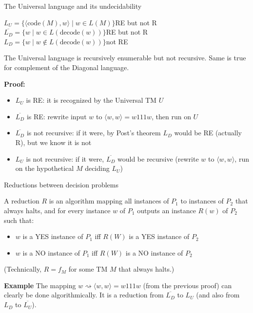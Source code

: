 \documentclass[handout]{beamer}
\begin{document}
\begin{frame}{The Universal language and its undecidability}

    $L_U=\{\langle \mathrm{code}(M),w\rangle\mid w\in L(M)\}$\hfill RE but not R\\
    $\overline{L_D}=\{w\mid w\in L(\mathrm{decode}(w))\}$\hfill RE but not R\\
    $L_D=\{w\mid w\notin L(\mathrm{decode}(w))\}$\hfill not RE

    \medskip

    \begin{theorem}
        The Universal language is recursively enumerable but not recursive. Same is true for complement of the Diagonal language.
    \end{theorem}    

    \vspace{-6pt}
    \textbf{Proof:}
    \vspace{-6pt}
        \begin{itemize}
            \item \alert{$L_U$ is RE:} it is recognized by the Universal TM $U$
            \item \alert{$\overline{L_D}$ is RE:} rewrite input $w$ to $\langle w,w\rangle=w111w$, then run on $U$
            \item \alert{$\overline{L_D}$ is not recursive:} if it were, by Post's theorem $L_D$ would be RE (actually R), but we know it is not
            \item \alert{$L_U$ is not recursive:} if it were, $\overline{L_D}$ would be recursive (rewrite $w$ to $\langle w,w\rangle$, run on the hypothetical $M$ deciding $L_U$)\hfill\qedsymbol
        \end{itemize}

\end{frame}


\begin{frame}{Reductions between decision problems}

    \begin{definition}
        A \alert{reduction} $R$ is an algorithm mapping all instances of $P_1$ to instances of $P_2$ that always halts, and for every instance $w$ of $P_1$ outputs an instance $R(w)$ of $P_2$ such that:
        \begin{itemize}
            \item $w$ is a YES instance of $P_1$ iff $R(W)$ is a YES instance of $P_2$
            \item $w$ is a NO instance of $P_1$ iff $R(W)$ is a NO instance of $P_2$
        \end{itemize}
        (Technically, $R=f_M$ for some TM $M$ that always halts.)
    \end{definition}
    
    \textbf{Example} The mapping $w\rightsquigarrow \langle w,w\rangle=w111w$ (from the previous proof) can clearly be done algorithmically. It is a reduction from $\overline{L_D}$ to $L_U$ (and also from $L_D$ to $\overline{L_U}$).

\end{frame}
\end{document}
